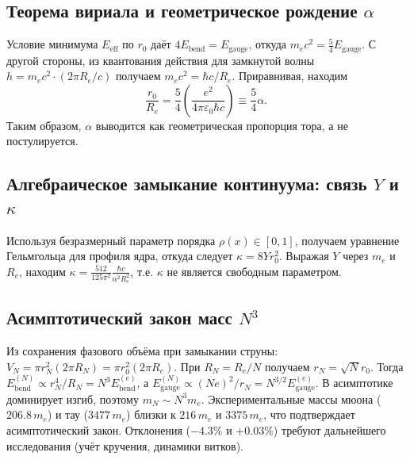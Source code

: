 \documentclass[11pt,a4paper]{article}
\begin{document}
	\subsection{Теорема вириала и геометрическое рождение $\alpha$}
	Условие минимума $E_{\text{eff}}$ по $r_0$ даёт $4E_{\text{bend}}=E_{\text{gauge}}$, откуда $m_e c^2 = \frac{5}{4}E_{\text{gauge}}$. С другой стороны, из квантования действия для замкнутой волны $h = m_e c^2 \cdot (2\pi R_e/c)$ получаем $m_e c^2 = \hbar c/R_e$. Приравнивая, находим
	\begin{equation}
		\frac{r_0}{R_e} = \frac{5}{4}\left(\frac{e^2}{4\pi\varepsilon_0\hbar c}\right) \equiv \frac{5}{4}\alpha.
	\end{equation}
	Таким образом, $\alpha$ выводится как геометрическая пропорция тора, а не постулируется.
	
	\subsection{Алгебраическое замыкание континуума: связь $Y$ и $\kappa$}
	Используя безразмерный параметр порядка $\rho(x)\in[0,1]$, получаем уравнение Гельмгольца для профиля ядра, откуда следует $\kappa = 8Y r_0^2$. Выражая $Y$ через $m_e$ и $R_e$, находим $\kappa = \frac{512}{125\pi^2}\frac{\hbar c}{\alpha^2 R_e^2}$, т.е. $\kappa$ не является свободным параметром.
	
	\subsection{Асимптотический закон масс $N^3$}
	Из сохранения фазового объёма при замыкании струны: $V_N = \pi r_N^2(2\pi R_N) = \pi r_0^2(2\pi R_e)$. При $R_N = R_e/N$ получаем $r_N = \sqrt{N}r_0$. Тогда $E_{\text{bend}}^{(N)}\propto r_N^4/R_N = N^3 E_{\text{bend}}^{(e)}$, а $E_{\text{gauge}}^{(N)}\propto (Ne)^2/r_N = N^{3/2} E_{\text{gauge}}^{(e)}$. В асимптотике доминирует изгиб, поэтому $m_N \sim N^3 m_e$. Экспериментальные массы мюона ($206.8\,m_e$) и тау ($3477\,m_e$) близки к $216\,m_e$ и $3375\,m_e$, что подтверждает асимптотический закон. Отклонения ($-4.3\%$ и $+0.03\%$) требуют дальнейшего исследования (учёт кручения, динамики витков).
	
\end{document}
